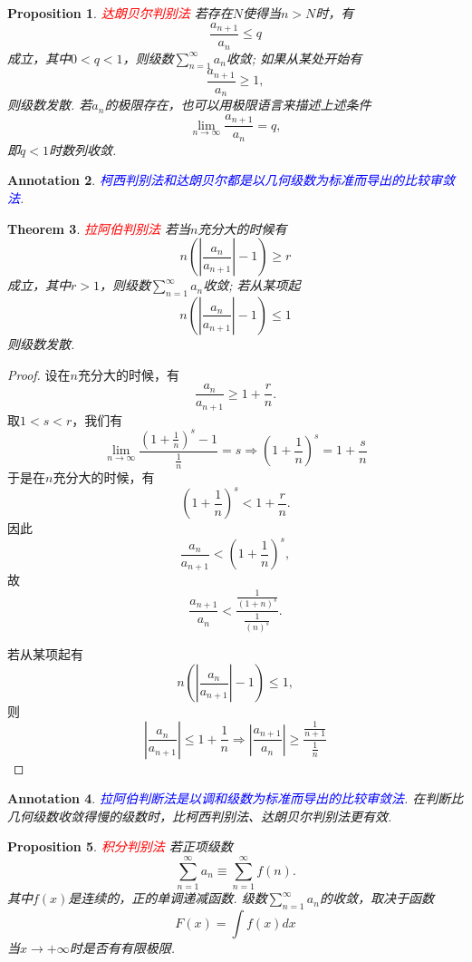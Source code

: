 \documentclass{article}
\newtheorem{theorem}{Theorem}[section]
\newtheorem{proposition}[theorem]{Proposition}
\newtheorem{annotation}[theorem]{Annotation}
\newcommand{\redt}[1]{\textcolor{red}{#1}}
\newcommand{\bluet}[1]{\textcolor{blue}{#1}}
\begin{document}
\begin{proposition}
\rm \redt{达朗贝尔判别法} 若存在$N$使得当$n > N$时，有
$$
\frac{a_{n+1}}{a_n} \leq q
$$
成立，其中$0 < q <1$，则级数$\sum\limits_{n=1}^\infty a_n$收敛; 如果从某处开始有
$$
\frac{a_{n+1}}{a_n} \geq 1,
$$
则级数发散. 若$a_n$的极限存在，也可以用极限语言来描述上述条件
$$
\lim\limits_{n \to \infty} \frac{a_{n+1}}{a_n} = q,
$$
即$q < 1$时数列收敛. 
\end{proposition}

\begin{annotation}
\rm \bluet{柯西判别法和达朗贝尔都是以几何级数为标准而导出的比较审敛法}. 
\end{annotation}

\begin{theorem}
\rm \redt{拉阿伯判别法} 若当$n$充分大的时候有
$$
n\left( \left| \frac{a_n}{a_{n+1}} \right| - 1\right) \geq r
$$
成立，其中$r > 1$，则级数$\sum\limits_{n=1}^\infty a_n$收敛; 若从某项起
$$
n\left( \left| \frac{a_n}{a_{n+1}} \right| - 1\right) \leq 1
$$
则级数发散. 
\end{theorem}

\begin{proof}
设在$n$充分大的时候，有
$$
\frac{a_n}{a_{n+1}} \geq  1 + \frac{r}{n}.
$$
取$1< s < r$，我们有
$$
\lim\limits_{n \to \infty} \frac{(1+\frac{1}{n})^s-1}{\frac{1}{n}} = s \Rightarrow  (1+\frac{1}{n})^s = 1 + \frac{s}{n}
$$
于是在$n$充分大的时候，有
$$
(1+\frac{1}{n})^s < 1+\frac{r}{n}. 
$$
因此
$$
\frac{a_n}{a_{n+1}} < (1+\frac{1}{n})^s,
$$
故
$$
\frac{a_{n+1}}{a_n} < \frac{\frac{1}{(1+n)^s}}{\frac{1}{(n)^s}}.
$$

若从某项起有
$$
n\left( \left| \frac{a_n}{a_{n+1}} \right| - 1\right) \leq 1,
$$
则
$$
\left| \frac{a_n}{a_{n+1}} \right| \leq 1 + \frac{1}{n} \Rightarrow \left| \frac{a_{n+1}}{a_{n}}\right| \geq \frac{\frac{1}{n+1}}{\frac{1}{n}}
$$
\end{proof}

\begin{annotation}
\rm \bluet{拉阿伯判断法是以调和级数为标准而导出的比较审敛法}. 在判断比几何级数收敛得慢的级数时，比柯西判别法、达朗贝尔判别法更有效. 
\end{annotation}

\begin{proposition}
\rm \redt{积分判别法} 若正项级数
$$
\sum\limits_{n=1}^\infty a_n \equiv \sum\limits_{n=1}^\infty f(n).
$$
其中$f(x)$是连续的，正的单调递减函数. 级数$\sum\limits_{n=1}^\infty a_n$的收敛，取决于函数
$$
F(x) = \int f(x)dx
$$
当$x \to +\infty$时是否有有限极限. 
\end{proposition}
\end{document}
